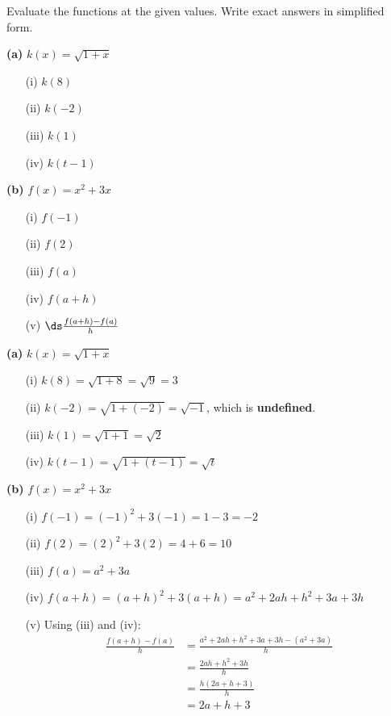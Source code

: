 \documentclass{ximera}
\begin{document}
\begin{problem}
Evaluate the functions at the given values. Write exact answers in simplified form.

\medskip
\textbf{(a)} $k(x) = \sqrt{1+x}$
\begin{enumerate}
  \item[(i)] $k(8)$
  \medskip
  \item[(ii)] $k(-2)$
  \medskip
  \item[(iii)] $k(1)$
  \medskip
  \item[(iv)] $k(t-1)$
\end{enumerate}

\medskip
\textbf{(b)} $f(x) = x^2 + 3x$
\begin{enumerate}
  \item[(i)] $f(-1)$
  \medskip
  \item[(ii)] $f(2)$
  \medskip
  \item[(iii)] $f(a)$
  \medskip
  \item[(iv)] $f(a+h)$
  \medskip
  \item[(v)] $\ds\frac{f(a+h) - f(a)}{h}$
\end{enumerate}

\begin{solution}
\textbf{(a)} $k(x) = \sqrt{1+x}$
\begin{enumerate}
  \item[(i)] $k(8) = \sqrt{1+8} = \sqrt{9} = 3$
  \item[(ii)] $k(-2) = \sqrt{1+(-2)} = \sqrt{-1}$, which is \textbf{undefined}.
  \item[(iii)] $k(1) = \sqrt{1+1} = \sqrt{2}$
  \item[(iv)] $k(t-1) = \sqrt{1+(t-1)} = \sqrt{t}$
\end{enumerate}

\medskip
\textbf{(b)} $f(x) = x^2+3x$
\begin{enumerate}
  \item[(i)] $f(-1) = (-1)^2 + 3(-1) = 1-3 = -2$
  \item[(ii)] $f(2) = (2)^2 + 3(2) = 4+6 = 10$
  \item[(iii)] $f(a) = a^2+3a$
  \item[(iv)] $f(a+h) = (a+h)^2 + 3(a+h) = a^2+2ah+h^2+3a+3h$
  \item[(v)] Using (iii) and (iv):
  \begin{align*}
    \frac{f(a+h)-f(a)}{h} &= \frac{a^2+2ah+h^2+3a+3h-(a^2+3a)}{h}\\
    &= \frac{2ah+h^2+3h}{h}\\
    &= \frac{h(2a+h+3)}{h}\\
    &= 2a+h+3
  \end{align*}
\end{enumerate}
\end{solution}
\end{problem}
\end{document}
